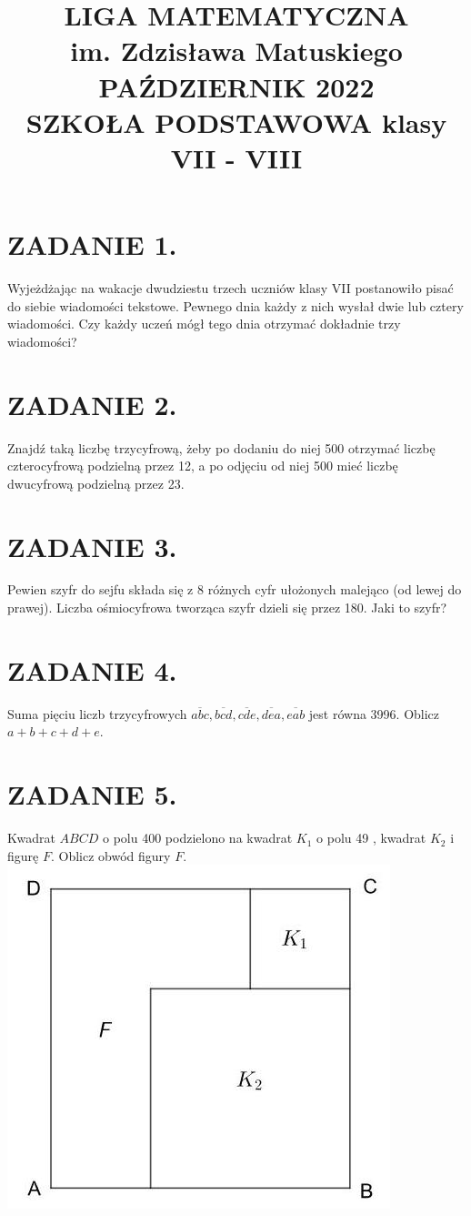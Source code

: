 \documentclass[10pt]{article}
\title{LIGA MATEMATYCZNA \\
 im. Zdzisława Matuskiego \\
 PAŹDZIERNIK 2022 \\
 SZKOŁA PODSTAWOWA klasy VII - VIII }
\author{}
\date{}
\begin{document}
\maketitle
\section*{ZADANIE 1.}
Wyjeżdżając na wakacje dwudziestu trzech uczniów klasy VII postanowiło pisać do siebie wiadomości tekstowe. Pewnego dnia każdy z nich wysłał dwie lub cztery wiadomości. Czy każdy uczeń mógł tego dnia otrzymać dokładnie trzy wiadomości?

\section*{ZADANIE 2.}
Znajdź taką liczbę trzycyfrową, żeby po dodaniu do niej 500 otrzymać liczbę czterocyfrową podzielną przez 12, a po odjęciu od niej 500 mieć liczbę dwucyfrową podzielną przez 23.

\section*{ZADANIE 3.}
Pewien szyfr do sejfu składa się z 8 różnych cyfr ułożonych malejąco (od lewej do prawej). Liczba ośmiocyfrowa tworząca szyfr dzieli się przez 180. Jaki to szyfr?

\section*{ZADANIE 4.}
Suma pięciu liczb trzycyfrowych \(\overline{a b c}, \overline{b c d}, \overline{c d e}, \overline{d e a}, \overline{e a b}\) jest równa 3996. Oblicz \(a+b+c+d+e\).

\section*{ZADANIE 5.}
Kwadrat \(A B C D\) o polu 400 podzielono na kwadrat \(K_{1}\) o polu 49 , kwadrat \(K_{2}\) i figurę \(F\). Oblicz obwód figury \(F\).\\
\includegraphics[max width=\textwidth, center]{2024_11_21_f32d77642941077c0701g-1}
\end{document}
